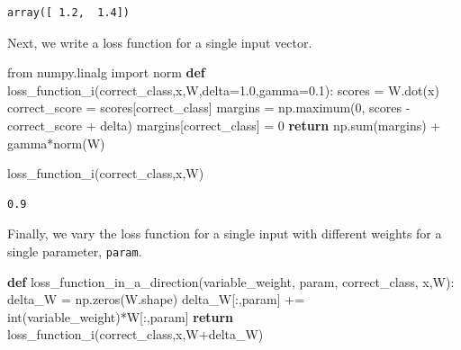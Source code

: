\documentclass[]{report}
\newenvironment{Shaded}{}{}
\newcommand{\KeywordTok}[1]{\textcolor[rgb]{0.00,0.44,0.13}{\textbf{{#1}}}}
\newcommand{\DecValTok}[1]{\textcolor[rgb]{0.25,0.63,0.44}{{#1}}}
\newcommand{\FloatTok}[1]{\textcolor[rgb]{0.25,0.63,0.44}{{#1}}}
\newcommand{\ImportTok}[1]{{#1}}
\newcommand{\ControlFlowTok}[1]{\textcolor[rgb]{0.00,0.44,0.13}{\textbf{{#1}}}}
\newcommand{\OperatorTok}[1]{\textcolor[rgb]{0.40,0.40,0.40}{{#1}}}
\newcommand{\BuiltInTok}[1]{{#1}}
\newcommand{\NormalTok}[1]{{#1}}
\begin{document}
\begin{verbatim}
array([ 1.2,  1.4])
\end{verbatim}

Next, we write a loss function for a single input vector.

\begin{Shaded}
\begin{Highlighting}[]
\ImportTok{from} \NormalTok{numpy.linalg }\ImportTok{import} \NormalTok{norm}
\KeywordTok{def} \NormalTok{loss_function_i(correct_class,x,W,delta}\OperatorTok{=}\FloatTok{1.0}\NormalTok{,gamma}\OperatorTok{=}\FloatTok{0.1}\NormalTok{):}
    \NormalTok{scores }\OperatorTok{=} \NormalTok{W.dot(x)}
    \NormalTok{correct_score }\OperatorTok{=} \NormalTok{scores[correct_class]}
    \NormalTok{margins }\OperatorTok{=} \NormalTok{np.maximum(}\DecValTok{0}\NormalTok{, scores }\OperatorTok{-} \NormalTok{correct_score }\OperatorTok{+} \NormalTok{delta)}
    \NormalTok{margins[correct_class] }\OperatorTok{=} \DecValTok{0}
    \ControlFlowTok{return} \NormalTok{np.}\BuiltInTok{sum}\NormalTok{(margins) }\OperatorTok{+} \NormalTok{gamma}\OperatorTok{*}\NormalTok{norm(W)}
\end{Highlighting}
\end{Shaded}

\begin{Shaded}
\begin{Highlighting}[]
\NormalTok{loss_function_i(correct_class,x,W)}
\end{Highlighting}
\end{Shaded}

\begin{verbatim}
0.9
\end{verbatim}

Finally, we vary the loss function for a single input with different
weights for a single parameter, \texttt{param}.

\begin{Shaded}
\begin{Highlighting}[]
\KeywordTok{def} \NormalTok{loss_function_in_a_direction(variable_weight,}
                                 \NormalTok{param,}
                                 \NormalTok{correct_class,}
                                 \NormalTok{x,W):}
    \NormalTok{delta_W }\OperatorTok{=} \NormalTok{np.zeros(W.shape)}
    \NormalTok{delta_W[:,param] }\OperatorTok{+=} \BuiltInTok{int}\NormalTok{(variable_weight)}\OperatorTok{*}\NormalTok{W[:,param]}
    \ControlFlowTok{return} \NormalTok{loss_function_i(correct_class,x,W}\OperatorTok{+}\NormalTok{delta_W)}
\end{Highlighting}
\end{Shaded}
\end{document}
